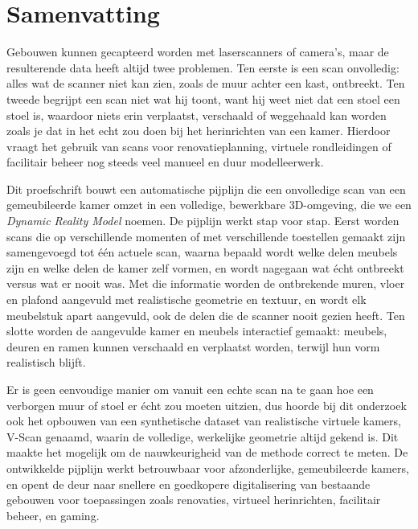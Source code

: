 
\chapter*{Samenvatting}


Gebouwen kunnen gecapteerd worden met laserscanners of camera's, maar de resulterende data heeft altijd twee problemen. Ten eerste is een scan onvolledig: alles wat de scanner niet kan zien, zoals de muur achter een kast, ontbreekt. Ten tweede begrijpt een scan niet wat hij toont, want hij weet niet dat een stoel een stoel is, waardoor niets erin verplaatst, verschaald of weggehaald kan worden zoals je dat in het echt zou doen bij het herinrichten van een kamer. Hierdoor vraagt het gebruik van scans voor renovatieplanning, virtuele rondleidingen of facilitair beheer nog steeds veel manueel en duur modelleerwerk.

Dit proefschrift bouwt een automatische pijplijn die een onvolledige scan van een gemeubileerde kamer omzet in een volledige, bewerkbare 3D-omgeving, die we een \textit{Dynamic Reality Model} noemen. De pijplijn werkt stap voor stap. Eerst worden scans die op verschillende momenten of met verschillende toestellen gemaakt zijn samengevoegd tot één actuele scan, waarna bepaald wordt welke delen meubels zijn en welke delen de kamer zelf vormen, en wordt nagegaan wat écht ontbreekt versus wat er nooit was. Met die informatie worden de ontbrekende muren, vloer en plafond aangevuld met realistische geometrie en textuur, en wordt elk meubelstuk apart aangevuld, ook de delen die de scanner nooit gezien heeft. Ten slotte worden de aangevulde kamer en meubels interactief gemaakt: meubels, deuren en ramen kunnen verschaald en verplaatst worden, terwijl hun vorm realistisch blijft.

Er is geen eenvoudige manier om vanuit een echte scan na te gaan hoe een verborgen muur of stoel er écht zou moeten uitzien, dus hoorde bij dit onderzoek ook het opbouwen van een synthetische dataset van realistische virtuele kamers, V-Scan genaamd, waarin de volledige, werkelijke geometrie altijd gekend is. Dit maakte het mogelijk om de nauwkeurigheid van de methode correct te meten. De ontwikkelde pijplijn werkt betrouwbaar voor afzonderlijke, gemeubileerde kamers, en opent de deur naar snellere en goedkopere digitalisering van bestaande gebouwen voor toepassingen zoals renovaties, virtueel herinrichten, facilitair beheer, en gaming.


\cleardoublepage

